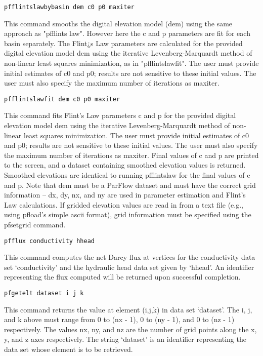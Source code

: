 \begin{description}
\item{\begin{verbatim}pfflintslawbybasin dem c0 p0 maxiter\end{verbatim}}
This command smooths the digital elevation model (dem) using  the same approach
as "pfflints law". However here the c and p parameters are fit for each basin separately.
The Flint¿s Law parameters are calculated for the provided digital elevation model dem
using the iterative Levenberg-Marquardt method of non-linear least squares minimization,
as in "pfflintslawfit". The user must provide initial estimates of c0 and p0; results are
not sensitive to these initial values. The user must also specify the maximum number of
iterations as maxiter.

\item{\begin{verbatim}pfflintslawfit dem c0 p0 maxiter\end{verbatim}}
This command fits Flint's Law parameters c and p for the provided digital elevation
model dem using the iterative Levenberg-Marquardt method of non-linear least squares
minimization. The user must provide initial estimates of c0 and p0; results are not
sensitive to these initial values. The user must also specify the maximum number of
iterations as maxiter. Final values of c and p are printed to the screen, and a
dataset containing smoothed elevation values is returned. Smoothed elevations are
identical to running pfflintslaw for the final values of c and p. Note that dem
must be a ParFlow dataset and must have the correct grid information -- dx, dy, nx,
and ny are used in parameter estimation and Flint's Law calculations. If gridded
elevation values are read in from a text file (e.g., using pfload's simple ascii
format), grid information must be specified using the pfsetgrid command.

\item{\begin{verbatim}pfflux conductivity hhead\end{verbatim}}
This command computes the net Darcy flux at vertices for the
conductivity data set `conductivity' and the hydraulic head data
set given by `hhead'.  An identifier representing the flux computed
will be returned upon successful completion.

\item{\begin{verbatim}pfgetelt dataset i j k\end{verbatim}}
This command returns the value at element (i,j,k) in data set
`dataset'.  The i, j, and k above must range from 0 to (nx - 1), 0 to
(ny - 1), and 0 to (nz - 1) respectively.  The values nx, ny, and nz
are the number of grid points along the x, y, and z axes respectively.
The string `dataset' is an identifier representing the data set whose
element is to be retrieved.


\end{description}
